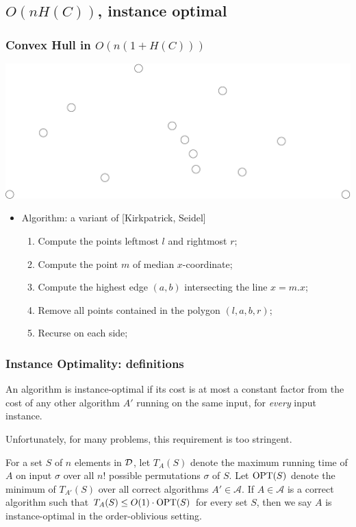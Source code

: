 \documentclass{beamer}
\newcommand{\OPT}{\mbox{\rm OPT}}
\newcommand{\A}{\mathcal{A}}
\begin{document}
\subsection{$O(n H(C))$, instance optimal}

\begin{frame}
  \frametitle{Convex Hull in $O(n(1+H(C)))$}
  \includegraphics[width=\textwidth]{points}
  \begin{itemize}
  \item Algorithm: a variant of [Kirkpatrick, Seidel]
    \begin{enumerate}
    \item Compute the points leftmost $l$ and rightmost $r$;
    \item Compute the point $m$ of median $x$-coordinate;
    \item Compute the highest edge $(a,b)$ intersecting the line $x=m.x$;
    \item Remove all points contained in the polygon $(l,a,b,r)$;
    \item Recurse on each side;
    \end{enumerate}
  \end{itemize}
\end{frame}

\begin{frame}
  \frametitle{Instance Optimality: definitions}
  
  \begin{definition}
    An algorithm is \alert{instance-optimal} if its cost is at most a
    constant factor from the cost of any other algorithm $A'$ running on
    the same input, for {\em every} input instance.
  \end{definition}
  
  Unfortunately, for many problems, this requirement is too stringent. 
  
  \begin{definition}
    For a set $S$ of $n$ elements in ${\cal D}$, let $T_A(S)$ denote
    the maximum running time of $A$ on input $\sigma$ over all $n!$
    possible permutations $\sigma$ of $S$.  Let $\OPT(S)$ denote the
    minimum of $T_{A'}(S)$ over all correct algorithms $A'\in\A$.  If
    $A\in\A$ is a correct algorithm such that $T_A(S)\le
    O(1)\cdot\OPT(S)$ for every set $S$, then we say $A$ is
    \alert{instance-optimal in the order-oblivious setting}.
  \end{definition}
\end{frame}
\end{document}
